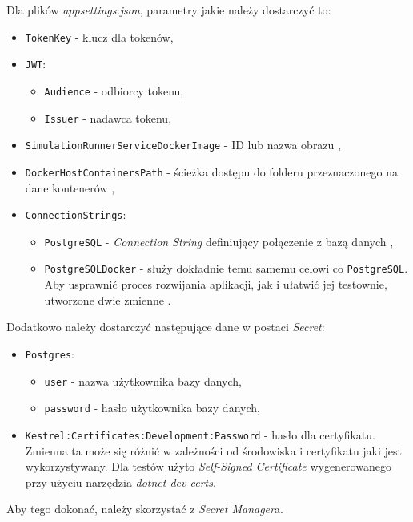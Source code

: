 \par Dla plików \emph{appsettings.json}, parametry jakie należy dostarczyć to:
\begin{itemize}
	\item \texttt{TokenKey} - klucz dla tokenów,
	\item \texttt{JWT}:
	\begin{itemize}
		\item \texttt{Audience} - odbiorcy tokenu,
		\item \texttt{Issuer} - nadawca tokenu,
	\end{itemize}
	\item \texttt{SimulationRunnerServiceDockerImage} - ID lub nazwa obrazu \emph{\docker{}},
	\item \texttt{DockerHostContainersPath} - ścieżka dostępu do folderu przeznaczonego na dane kontenerów ,
	\item \texttt{ConnectionStrings}:
	\begin{itemize}
		\item \texttt{PostgreSQL} - \emph{Connection String} definiujący połączenie z bazą danych ,
		\item \texttt{PostgreSQLDocker} - służy dokładnie temu samemu celowi co \texttt{PostgreSQL}. Aby usprawnić proces rozwijania aplikacji, jak i ułatwić jej testownie, utworzone dwie zmienne .
	\end{itemize}
\end{itemize}

\par Dodatkowo należy dostarczyć następujące dane w postaci \emph{\dotnet{} Secret}:
\begin{itemize}
	\item \texttt{Postgres}:
	\begin{itemize}
		\item \texttt{user} - nazwa użytkownika bazy danych,
		\item \texttt{password} - hasło użytkownika bazy danych,
	\end{itemize}
	\item \texttt{Kestrel:Certificates:Development:Password} - hasło dla certyfikatu. Zmienna ta może się różnić w zależności od środowiska i certyfikatu jaki jest wykorzystywany. Dla testów użyto \emph{Self-Signed Certificate} wygenerowanego przy użyciu narzędzia \emph{dotnet dev-certs}.
\end{itemize}

Aby tego dokonać, należy skorzystać z \emph{Secret Manager}a.\cite{DOTNET_SECRET_MANAGER}

